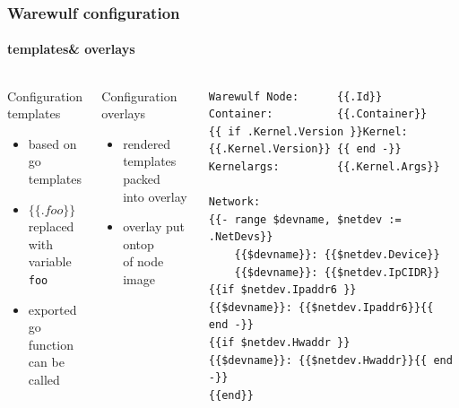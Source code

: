 \documentclass[aspectratio=169]{beamer}
\begin{document}
\begin{frame}[fragile]
\frametitle{Warewulf configuration}
\framesubtitle{templates\& overlays}
\begin{columns}
\begin{block}{Configuration templates}
  \begin{itemize}
    \item based on go templates
    \item $\{\{ .foo \}\}$ replaced \\
    with variable \texttt{foo}
    \item exported go function \\
    can be called
  \end{itemize}
\end{block}
\begin{block}{Configuration overlays}
\begin{itemize}
  \item rendered templates packed\\
  into overlay
  \item overlay put ontop \\
  of node image
\end{itemize}
\end{block}
\begin{lstlisting}[style=ww,caption=/etc/issue.ww]
Warewulf Node:      {{.Id}}
Container:          {{.Container}}
{{ if .Kernel.Version }}Kernel:             {{.Kernel.Version}} {{ end -}}
Kernelargs:         {{.Kernel.Args}}

Network:
{{- range $devname, $netdev := .NetDevs}}
    {{$devname}}: {{$netdev.Device}}
    {{$devname}}: {{$netdev.IpCIDR}}
{{if $netdev.Ipaddr6 }}    {{$devname}}: {{$netdev.Ipaddr6}}{{ end -}}
{{if $netdev.Hwaddr }}    {{$devname}}: {{$netdev.Hwaddr}}{{ end -}}
{{end}}
\end{lstlisting}
\end{columns}
\end{frame}
\end{document}
